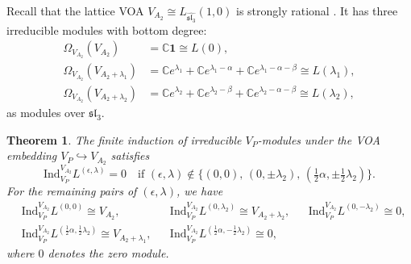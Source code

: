 \documentclass[12pt,a4paper,reqno]{amsart}
\numberwithin{equation}{section}
\numberwithin{equation}{section}
\newtheorem{thm}{Theorem}[section]
\theoremstyle{definition}
\def \C {\mathbb{C}}
\def\la{\lambda}
\def \al{\alpha}
\def \b {\beta}
\def \vac {\mathbf{1}}
\def\Ind{\mathrm{Ind}}
\def\Om{\Omega}
\def\<{\langle}
\def\>{\rangle}
\def\Ind{\mathrm{Ind}}
\def\sl{\mathfrak{sl}}
\begin{document}
		
		
		
		
		
		
		
		Recall that the lattice VOA $V_{A_2}\cong L_{\widehat{\sl_3}}(1,0)$ is strongly rational \cite{D,DLM1}. It has three irreducible modules with bottom degree: 
		\begin{align*}
			\Om_{V_{A_2}}(V_{A_2})&=\C \vac\cong L(0),\\
			\Om_{V_{A_2}}(	V_{A_2+\la_1})&=\C e^{\la_1}+\C e^{\la_1-\al}+\C e^{\la_1-\al-\b}\cong L(\la_1),\\ 
			\Om_{V_{A_2}}(V_{A_2+\la_2})&=\C e^{\la_2}+\C e^{\la_2-\b}+\C e^{\la_2-\al-\b}\cong L(\la_2),
		\end{align*}
		as modules over $\sl_3$. 
		\begin{thm}\label{thm:inducedmodulesforV_P}
			The finite induction of irreducible $V_P$-modules under the VOA embedding $V_P \hookrightarrow V_{A_2}$ satisfies
			\[
			\Ind^{V_{A_2}}_{V_P} L^{(\epsilon,\lambda)} = 0 \quad 
			\text{if } (\epsilon,\lambda)\notin \{(0,0),\,(0,\pm \lambda_2),\, (\tfrac{1}{2}\alpha,\pm \tfrac{1}{2}\lambda_2)\}.
			\]
	For the remaining pairs of $(\epsilon,\la)$, we have 
			\begin{align*}
				&\Ind^{V_{A_2}}_{V_P}L^{(0,0)} \cong V_{A_2}, 
				&& \Ind^{V_{A_2}}_{V_P}L^{(0, \lambda_2)} \cong V_{A_2+\lambda_2}, 
				&& \Ind^{V_{A_2}}_{V_P}L^{(0,- \lambda_2)} \cong 0,\\
				&\Ind^{V_{A_2}}_{V_P}L^{(\frac{1}{2}\alpha, \frac{1}{2}\lambda_2)} \cong  V_{A_2+\lambda_1}, 
				&& \Ind^{V_{A_2}}_{V_P}L^{(\frac{1}{2}\alpha, -\frac{1}{2}\lambda_2)} \cong  0,
			\end{align*}
			where $0$ denotes the zero module. 
		\end{thm}
		
\end{document}
